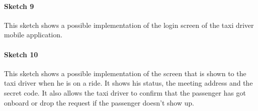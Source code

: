 \paragraph{Sketch 9}
This sketch shows a possible implementation of the login screen of the taxi driver mobile application.
\begin{figure}[H]
\centering
{}
\end{figure}


\paragraph{Sketch 10}
This sketch shows a possible implementation of the screen that is shown to the taxi driver when he is on a ride. It shows his status, the meeting address and the secret code. It also allows the taxi driver to confirm that the passenger has got onboard or drop the request if the passenger doesn't show up.
\begin{figure}[H]
\centering
{}
\end{figure}


